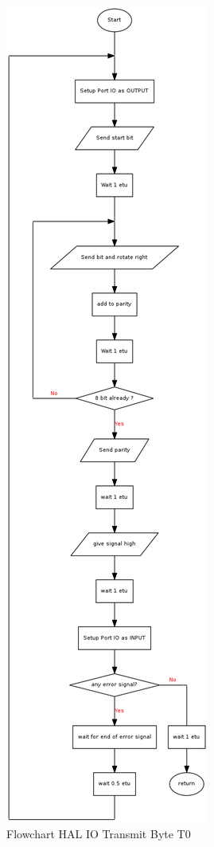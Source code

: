 \begin{figure}[!h]
\centering
\includegraphics[height=0.9\textheight]{image/hal/flow_txbytet0.png}
\caption{Flowchart HAL IO Transmit Byte T0}
\label{fig-flow-txbytet0}
\end{figure}

